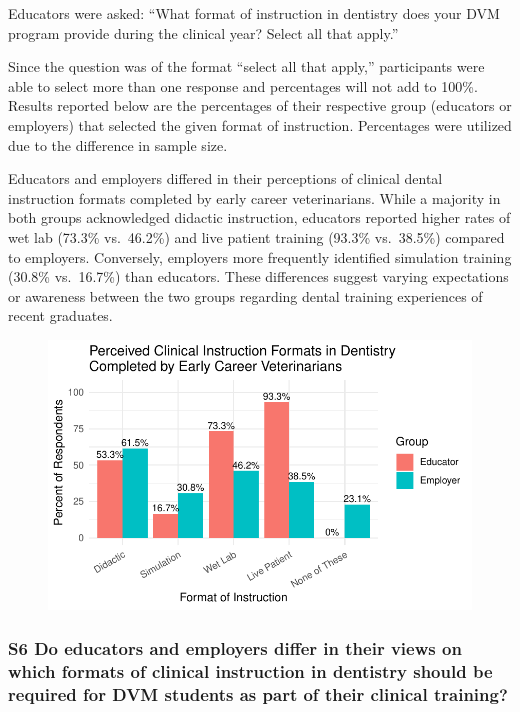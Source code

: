 \documentclass[
  11pt,
  letterpaper,
  DIV=11,
  numbers=noendperiod]{scrartcl}
\begin{document}
Educators were asked: ``What format of instruction in dentistry does
your DVM program provide during the clinical year? Select all that
apply.''

Since the question was of the format ``select all that apply,''
participants were able to select more than one response and percentages
will not add to 100\%. Results reported below are the percentages of
their respective group (educators or employers) that selected the given
format of instruction. Percentages were utilized due to the difference
in sample size.

Educators and employers differed in their perceptions of clinical dental
instruction formats completed by early career veterinarians. While a
majority in both groups acknowledged didactic instruction, educators
reported higher rates of wet lab (73.3\% vs.~46.2\%) and live patient
training (93.3\% vs.~38.5\%) compared to employers. Conversely,
employers more frequently identified simulation training (30.8\%
vs.~16.7\%) than educators. These differences suggest varying
expectations or awareness between the two groups regarding dental
training experiences of recent graduates.

\begin{figure}[H]

{\centering \includegraphics{Final-Project_files/figure-pdf/unnamed-chunk-1-1.pdf}

}

\end{figure}

\hypertarget{s6-do-educators-and-employers-differ-in-their-views-on-which-formats-of-clinical-instruction-in-dentistry-should-be-required-for-dvm-students-as-part-of-their-clinical-training}{%
\subsubsection{S6 Do educators and employers differ in their views on
which formats of clinical instruction in dentistry should be required
for DVM students as part of their clinical
training?}\label{s6-do-educators-and-employers-differ-in-their-views-on-which-formats-of-clinical-instruction-in-dentistry-should-be-required-for-dvm-students-as-part-of-their-clinical-training}}
\end{document}
